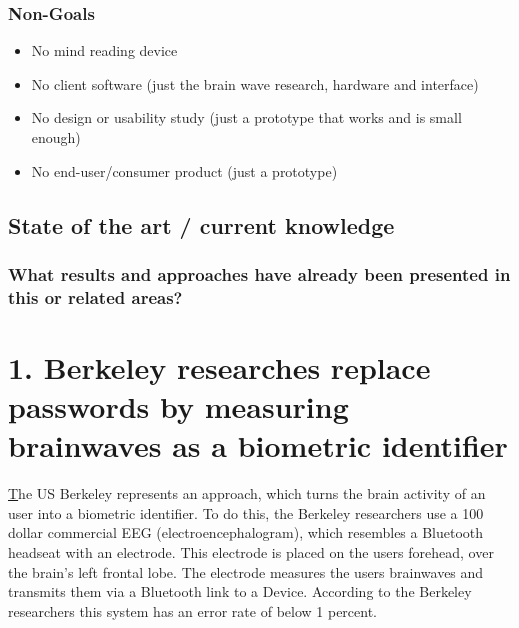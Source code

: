 \documentclass[a4paper,11pt]{article}
\begin{document}
\subsection{Non-Goals}
\begin{itemize}
	\item No mind reading device
	\item No client software (just the brain wave research, hardware and interface)
	\item No design or usability study (just a prototype that works and is small enough)
	\item No end-user/consumer product (just a prototype)
\end{itemize}



\section{State of the art / current knowledge}
\label{sect:star}
\subsection{What results and approaches have already been presented in this or related areas?}
\chapter{1. Berkeley researches replace passwords by measuring brainwaves as a biometric identifier}
\href{http://people.ischool.berkeley.edu/~chuang/pubs/usec13.pdf}
The US Berkeley represents an approach, which turns the brain activity of an user into a biometric identifier. To do this, the Berkeley researchers use a 100 dollar commercial EEG (electroencephalogram), which resembles a Bluetooth headseat with an electrode. This electrode is placed on the users forehead, over the brain's left frontal lobe. The electrode measures the users brainwaves and transmits them via a Bluetooth link to a Device. According to the Berkeley researchers this system has an error rate of below 1 percent.
\end{document}
